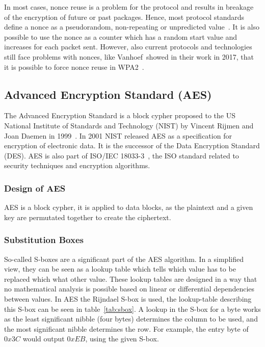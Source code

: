 In most cases, nonce reuse is a problem for the protocol and results in breakage
of the encryption of future or past packages. Hence, most protocol standards
define a nonce as a pseudorandom, non-repeating or unpredicted
value~\cite{noncegeneral}. It is also possible to use the nonce as a counter
which has a random start value and increases for each packet sent. However, also
current protocols and technologies still face problems with nonces, like
Vanhoef~\etal showed in their work in 2017, that it is possible to force nonce
reuse in WPA2~\cite{wpanoncereuse}.

\subsection{Advanced Encryption Standard (AES)}

The Advanced Encryption Standard is a block cypher proposed to the US National
Institute of Standards and Technology (NIST) by Vincent Rijmen and Joan Daemen
in 1999~\cite{aesproposal}. In 2001 NIST released AES as a specification for
encryption of electronic data. It is the successor of the Data Encryption
Standard (DES). AES is also part of ISO/IEC 18033-3~\cite{iso18033}, the ISO
standard related to security techniques and encryption algorithms.

\subsubsection{Design of AES}

AES is a block cypher, it is applied to data blocks, as the plaintext and a
given key are permutated together to create the ciphertext.

\subsubsection{Substitution Boxes}

So-called S-boxes are a significant part of the AES algorithm. In a simplified
view, they can be seen as a lookup table which tells which value has to be
replaced which what other value. These lookup tables are designed in a way that
no mathematical analysis is possible based on linear or differential
dependencies between values. In AES the Rijndael S-box is used, the
lookup-table describing this S-box can be seen in table~\ref{tab:sbox}. A
lookup in the S-box for a byte works as the least significant nibble (four
bytes) determines the column to be used, and the most significant nibble
determines the row. For example, the entry byte of $0x3C$ would output $0xEB$,
using the given S-box.


